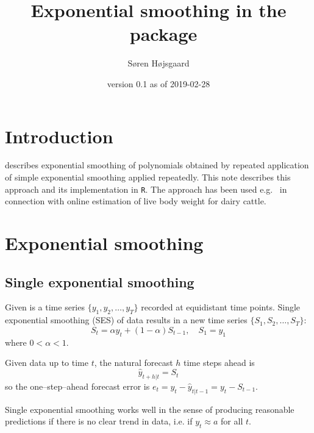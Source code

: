 \documentclass[10pt]{article}\usepackage[]{graphicx}\usepackage[]{color}
\title{Exponential smoothing in the \di\ package}
\author{S{\o}ren H{\o}jsgaard}
\date{\pkg{dataIrony} version 0.1 as of 2019-02-28}
\def\R{\texttt{R}}
\begin{document}


\maketitle


\def\DS{S^{[2]}}





\tableofcontents
\parindent0pt\parskip5pt

\section{Introduction}
\label{sec:introduction}

\cite{brown:1963} describes exponential smoothing of polynomials
obtained by repeated application of simple exponential smoothing
applied repeatedly. This note describes this approach and its
implementation in \R. The approach has been used e.g.\ 
\cite{thorup:etal:2013} in connection with online estimation of live body
weight for dairy cattle.



\section{Exponential smoothing}
\label{sec:expon-smooth}


\subsection{Single exponential smoothing}
\label{sec:ses}

Given is a time series $\{y_1, y_2, \dots, y_T\}$ recorded at
equidistant time points.  Single exponential smoothing (SES) of
data results in a new time series $\{S_1, S_2, \dots, S_T\}$:
\begin{displaymath}
  S_t = \alpha y_t + (1-\alpha) S_{t-1}, \quad S_1=y_1
\end{displaymath}
where $0 < \alpha < 1$.

Given data up to time $t$, the natural forecast $h$ time steps ahead is
\begin{displaymath}
  \hat y_{t+h|t} = S_t
\end{displaymath}
so the one--step--ahead forecast error is
$e_t = y_t - \hat y_{t|t-1} = y_t-S_{t-1}$.

Single exponential smoothing works well in the sense of producing
reasonable predictions if there is no clear trend in data, i.e. if
$y_t \approx a$ for all $t$.
\end{document}
